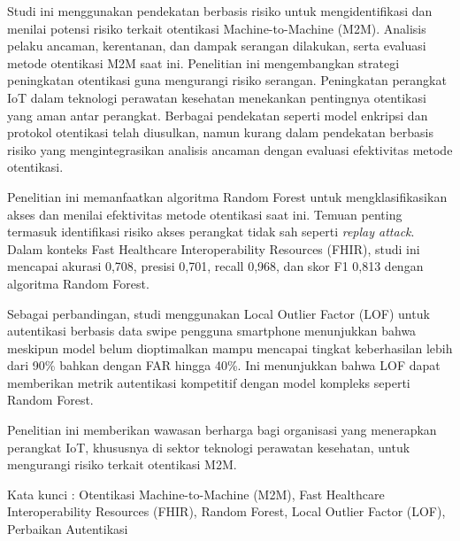 Studi ini menggunakan pendekatan berbasis risiko untuk mengidentifikasi dan menilai potensi risiko terkait otentikasi Machine-to-Machine (M2M). Analisis pelaku ancaman, kerentanan, dan dampak serangan dilakukan, serta evaluasi metode otentikasi M2M saat ini. Penelitian ini mengembangkan strategi peningkatan otentikasi guna mengurangi risiko serangan. Peningkatan perangkat IoT dalam teknologi perawatan kesehatan menekankan pentingnya otentikasi yang aman antar perangkat. Berbagai pendekatan seperti model enkripsi dan protokol otentikasi telah diusulkan, namun kurang dalam pendekatan berbasis risiko yang mengintegrasikan analisis ancaman dengan evaluasi efektivitas metode otentikasi.

Penelitian ini memanfaatkan algoritma Random Forest untuk mengklasifikasikan akses dan menilai efektivitas metode otentikasi saat ini. Temuan penting termasuk identifikasi risiko akses perangkat tidak sah seperti \textit{replay attack}. Dalam konteks Fast Healthcare Interoperability Resources (FHIR), studi ini mencapai akurasi 0,708, presisi 0,701, recall 0,968, dan skor F1 0,813 dengan algoritma Random Forest.

Sebagai perbandingan, studi menggunakan Local Outlier Factor (LOF) untuk autentikasi berbasis data swipe pengguna smartphone menunjukkan bahwa meskipun model belum dioptimalkan mampu mencapai tingkat keberhasilan lebih dari 90\% bahkan dengan FAR hingga 40\%. Ini menunjukkan bahwa LOF dapat memberikan metrik autentikasi kompetitif dengan model kompleks seperti Random Forest. 

Penelitian ini memberikan wawasan berharga bagi organisasi yang menerapkan perangkat IoT, khususnya di sektor teknologi perawatan kesehatan, untuk mengurangi risiko terkait otentikasi M2M.


Kata kunci : Otentikasi Machine-to-Machine (M2M), Fast Healthcare Interoperability Resources (FHIR), Random Forest, Local Outlier Factor (LOF), Perbaikan Autentikasi
